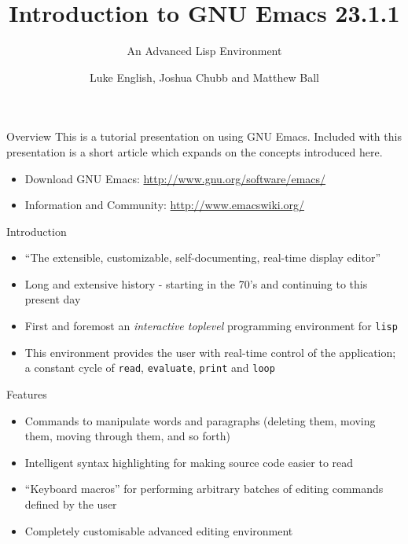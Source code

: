 \documentclass[12pt,a4paper,oneside]{beamer}
\title{Introduction to GNU Emacs 23.1.1}
\subtitle{An Advanced Lisp Environment}
\author{Luke English, Joshua Chubb and Matthew Ball}
\date{}
\begin{document}
\begin{frame}
\titlepage
\end{frame}

\begin{frame}{Overview}
This is a tutorial presentation on using GNU Emacs. Included with this presentation is a short article which expands on the concepts introduced here.\newline

\begin{itemize}
  \item Download GNU Emacs: \url{http://www.gnu.org/software/emacs/}\newline
  \item Information and Community: \url{http://www.emacswiki.org/}
\end{itemize}

\end{frame}

\begin{frame}{Introduction}
\begin{itemize}
  \item ``The extensible, customizable, self-documenting, real-time display editor''\newline
  \item Long and extensive history - starting in the 70's and continuing to this present day\newline
  \item First and foremost an \emph{interactive toplevel} programming environment for \texttt{lisp}\newline
  \item This environment provides the user with real-time control of the application; a constant cycle of \texttt{read}, \texttt{evaluate}, \texttt{print} and \texttt{loop}
\end{itemize}
\end{frame}


\begin{frame}{Features}
\begin{itemize}
  \item Commands to manipulate words and paragraphs (deleting them, moving them, moving through them, and so forth)\newline
  \item Intelligent syntax highlighting for making source code easier to read\newline
  \item ``Keyboard macros'' for performing arbitrary batches of editing commands defined by the user\newline
  \item Completely customisable advanced editing environment
\end{itemize}
\end{frame}
\end{document}
